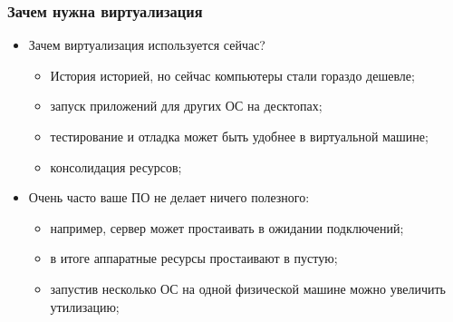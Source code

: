 \begin{frame}
\frametitle{Зачем нужна виртуализация}
\begin{itemize}
  \item<1-> Зачем виртуализация используется сейчас?
    \begin{itemize}
      \item История историей, но сейчас компьютеры стали гораздо дешевле;
      \item запуск приложений для других ОС на десктопах;
      \item тестирование и отладка может быть удобнее в виртуальной машине;
      \item консолидация ресурсов;
    \end{itemize}
  \item<2-> Очень часто ваше ПО не делает ничего полезного:
    \begin{itemize}
      \item например, сервер может простаивать в ожидании подключений;
      \item в итоге аппаратные ресурсы простаивают в пустую;
      \item запустив несколько ОС на одной физической машине можно увеличить
            утилизацию;
    \end{itemize}
\end{itemize}
\end{frame}
